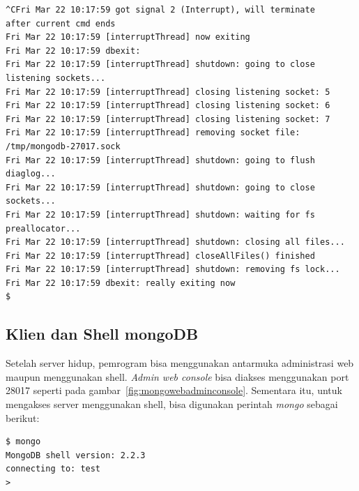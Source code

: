 \lstset{language=bash,caption=Mengakhiri server MongoDB (mongod)}
\begin{lstlisting}
^CFri Mar 22 10:17:59 got signal 2 (Interrupt), will terminate 
after current cmd ends
Fri Mar 22 10:17:59 [interruptThread] now exiting
Fri Mar 22 10:17:59 dbexit: 
Fri Mar 22 10:17:59 [interruptThread] shutdown: going to close 
listening sockets...
Fri Mar 22 10:17:59 [interruptThread] closing listening socket: 5
Fri Mar 22 10:17:59 [interruptThread] closing listening socket: 6
Fri Mar 22 10:17:59 [interruptThread] closing listening socket: 7
Fri Mar 22 10:17:59 [interruptThread] removing socket file: 
/tmp/mongodb-27017.sock
Fri Mar 22 10:17:59 [interruptThread] shutdown: going to flush 
diaglog...
Fri Mar 22 10:17:59 [interruptThread] shutdown: going to close 
sockets...
Fri Mar 22 10:17:59 [interruptThread] shutdown: waiting for fs 
preallocator...
Fri Mar 22 10:17:59 [interruptThread] shutdown: closing all files...
Fri Mar 22 10:17:59 [interruptThread] closeAllFiles() finished
Fri Mar 22 10:17:59 [interruptThread] shutdown: removing fs lock...
Fri Mar 22 10:17:59 dbexit: really exiting now
$
\end{lstlisting}

\subsection{Klien dan Shell mongoDB}

Setelah server hidup, pemrogram bisa menggunakan antarmuka administrasi web maupun menggunakan shell. \textit{Admin web console} bisa diakses menggunakan port 28017 seperti pada gambar~\ref{fig:mongowebadminconsole}. Sementara itu, untuk mengakses server menggunakan shell, bisa digunakan perintah \textit{mongo} sebagai berikut:

\lstset{language=bash,caption=Shell mongoDB (mongo)}
\begin{lstlisting}
$ mongo
MongoDB shell version: 2.2.3
connecting to: test
> 
\end{lstlisting}

